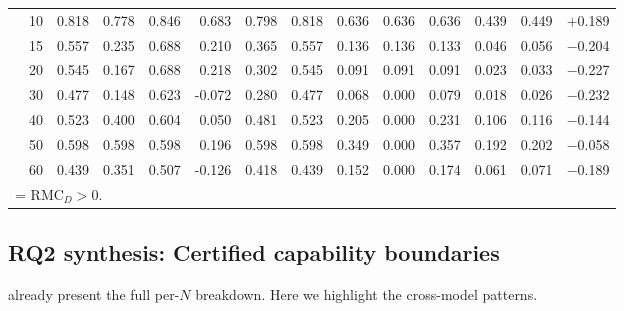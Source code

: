 \documentclass[conference]{IEEEtran}
\theoremstyle{remark}
\newcommand{\RMC}{\mathrm{RMC}}
\begin{document}
\begin{table}[ht]
{\begin{tabular}{p{1.55cm}r rrrr rr rr rrr r}
  & 10 & 0.818 & 0.778 & 0.846 & 0.683 & 0.798 & 0.818 & 0.636 & 0.636 & 0.636 & 0.439 & 0.449 & \cellcolor{green!15}$+$0.189 \\
  & 15 & 0.557 & 0.235 & 0.688 & 0.210 & 0.365 & 0.557 & 0.136 & 0.136 & 0.133 & 0.046 & 0.056 & $-$0.204 \\
  & 20 & 0.545 & 0.167 & 0.688 & 0.218 & 0.302 & 0.545 & 0.091 & 0.091 & 0.091 & 0.023 & 0.033 & $-$0.227 \\
  & 30 & 0.477 & 0.148 & 0.623 & -0.072 & 0.280 & 0.477 & 0.068 & 0.000 & 0.079 & 0.018 & 0.026 & $-$0.232 \\
  & 40 & 0.523 & 0.400 & 0.604 & 0.050 & 0.481 & 0.523 & 0.205 & 0.000 & 0.231 & 0.106 & 0.116 & $-$0.144 \\
  & 50 & 0.598 & 0.598 & 0.598 & 0.196 & 0.598 & 0.598 & 0.349 & 0.000 & 0.357 & 0.192 & 0.202 & $-$0.058 \\
  & 60 & 0.439 & 0.351 & 0.507 & -0.126 & 0.418 & 0.439 & 0.152 & 0.000 & 0.174 & 0.061 & 0.071 & $-$0.189 \\
\bottomrule
\multicolumn{14}{l}{\colorbox{green!15}{\phantom{X}} = $\RMC_D>0$.}
\end{tabular}%
}
\end{table}

\subsection{RQ2 synthesis: Certified capability boundaries}
\label{sec:phase}

 already present the full per-$N$ breakdown.
Here we highlight the cross-model patterns.
\end{document}
